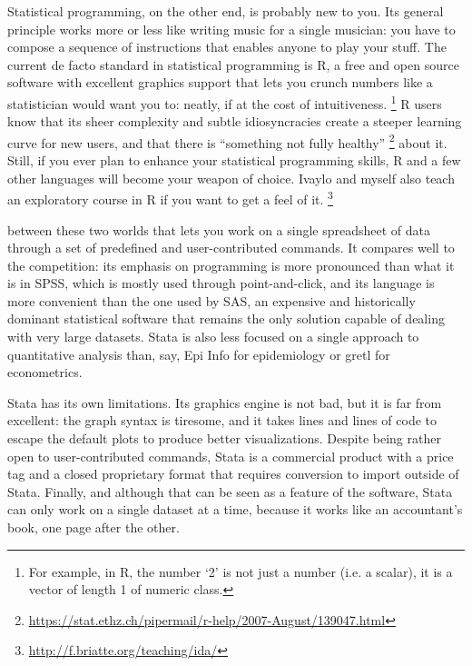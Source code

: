 	Statistical programming, on the other end, is probably new to you. Its general principle works more or less like writing music for a single musician: you have to compose a sequence of instructions that enables anyone to play your stuff. The current de facto standard in statistical programming is R, a free and open source software with excellent graphics support that lets you crunch numbers like a statistician would want you to: neatly, if at the cost of intuitiveness.%
		\footnote{For example, in R, the number `2' is not just a number (i.e. a scalar), it is a vector of length 1 of numeric class.} %
	 	R users know that its sheer complexity and subtle idiosyncracies create a steeper learning curve for new users, and that there is ``something not fully healthy''%
		\footnote{%
			\url{https://stat.ethz.ch/pipermail/r-help/2007-August/139047.html}} %
			about it. Still, if you ever plan to enhance your statistical programming skills, R and a few other languages will become your weapon of choice. Ivaylo and myself also teach an exploratory course in R if you want to get a feel of it.%
		\footnote{\url{http://f.briatte.org/teaching/ida/}}%

	 between these two worlds that lets you work on a single spreadsheet of data through a set of predefined and user-contributed commands. It compares well to the competition: its emphasis on programming is more pronounced than what it is in SPSS, which is mostly used through point-and-click, and its language is more convenient than the one used by SAS, an expensive and historically dominant statistical software that remains the only solution capable of dealing with very large datasets. Stata is also less focused on a single approach to quantitative analysis than, say, Epi Info for epidemiology or gretl for econometrics.%
		
	Stata has its own limitations. Its graphics engine is not bad, but it is far from excellent: the graph syntax is tiresome, and it takes lines and lines of code to escape the default plots to produce better visualizations. Despite being rather open to user-contributed commands, Stata is a commercial product with a price tag and a closed proprietary format that requires conversion to import outside of Stata. Finally, and although that can be seen as a feature of the software, Stata can only work on a single dataset at a time, because it works like an accountant's book, one page after the other.%

%
%
%
%
%
